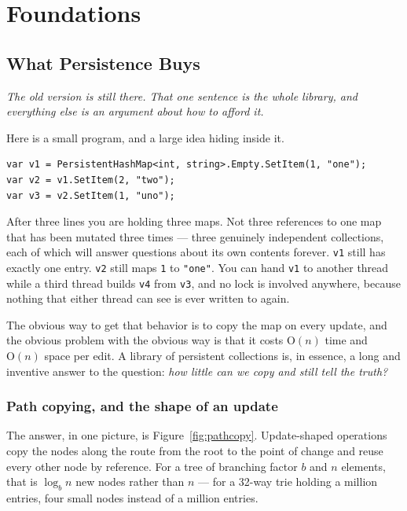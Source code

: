 \documentclass[11pt,twoside,openright]{book}
\newcommand{\code}[1]{\texorpdfstring{\textcolor{d7ink}{\texttt{#1}}}{#1}}
\newcommand{\bigoh}[1]{$\mathrm{O}(#1)$}
\newcommand{\motto}[1]{%
  \begingroup
  \vspace{-4pt}\hfill\begin{minipage}{0.80\textwidth}
    \raggedleft\itshape\color{d7slate}\small #1\par
  \end{minipage}\par\vspace{18pt}
  \endgroup}
\begin{document}
\mainmatter

\part{Foundations}
\label{part:foundations}

\chapter{What Persistence Buys}
\label{ch:persistence}

\motto{The old version is still there. That one sentence is the whole
library, and everything else is an argument about how to afford it.}

\noindent
Here is a small program, and a large idea hiding inside it.

\begin{lstlisting}[language={[Sharp]C}]
var v1 = PersistentHashMap<int, string>.Empty.SetItem(1, "one");
var v2 = v1.SetItem(2, "two");
var v3 = v2.SetItem(1, "uno");
\end{lstlisting}

\noindent
After three lines you are holding three maps. Not three references to one map
that has been mutated three times --- three genuinely independent collections,
each of which will answer questions about its own contents forever. \code{v1}
still has exactly one entry. \code{v2} still maps \code{1} to \code{"one"}. You
can hand \code{v1} to another thread while a third thread builds \code{v4} from
\code{v3}, and no lock is involved anywhere, because nothing that either thread
can see is ever written to again.

The obvious way to get that behavior is to copy the map on every update, and
the obvious problem with the obvious way is that it costs \bigoh{n} time and
\bigoh{n} space per edit. A library of persistent collections is, in essence, a
long and inventive answer to the question: \emph{how little can we copy and
still tell the truth?}

\section{Path copying, and the shape of an update}

The answer, in one picture, is Figure~\ref{fig:pathcopy}. Update-shaped
operations copy the nodes along the route from the root to the point of change
and reuse every other node by reference. For a tree of branching factor $b$ and
$n$ elements, that is $\log_b n$ new nodes rather than $n$ --- for a 32-way trie
holding a million entries, four small nodes instead of a million entries.
\end{document}
